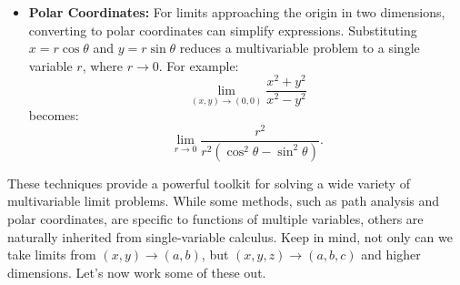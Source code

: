 \begin{itemize}
\noindent \textbf{Important:} Showing that the limit is the same along all straight-line paths \( y = mx \) is \textit{not} sufficient to prove a limit exists. One must also check nonlinear paths such as \( y = x^2 \). A classic example is \( f(x,y) = \frac{x^2 y}{x^4 + y^2} \), where the limit along every line through the origin is 0, but the limit along \( y = x^2 \) is \( \frac{1}{2} \).\\ \\

    \item \textbf{Polar Coordinates:} For limits approaching the origin in two dimensions, converting to polar coordinates can simplify expressions. Substituting \( x = r\cos\theta \) and \( y = r\sin\theta \) reduces a multivariable problem to a single variable \( r \), where \( r \to 0 \). For example:
    \[
    \lim_{(x, y) \to (0, 0)} \frac{x^2 + y^2}{x^2 - y^2}
    \]
    becomes:
    \[
    \lim_{r \to 0} \frac{r^2}{r^2(\cos^2\theta - \sin^2\theta)}.
    \]
\end{itemize}

\noindent These techniques provide a powerful toolkit for solving a wide variety of multivariable limit problems. While some methods, such as path analysis and polar coordinates, are specific to functions of multiple variables, others are naturally inherited from single-variable calculus. Keep in mind, not only can we take limits from $(x,y) \to (a,b)$, but $(x,y,z) \to (a,b,c)$ and higher dimensions. Let's now work some of these out.


